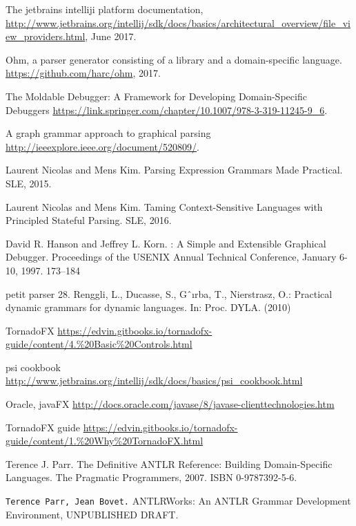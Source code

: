 
\begin{thebibliography}{9}

 The jetbrains intelliji platform documentation, 
	\url{http://www.jetbrains.org/intellij/sdk/docs/basics/architectural_overview/file_view_providers.html}, June 2017.

 Ohm, a parser generator consisting of a library and a domain-specific language.
	\url{https://github.com/harc/ohm}, 2017.	

 The Moldable Debugger: A Framework for Developing Domain-Specific Debuggers
	\url{https://link.springer.com/chapter/10.1007/978-3-319-11245-9_6}.

A graph grammar approach to graphical parsing
	\url{http://ieeexplore.ieee.org/document/520809/}.

Laurent Nicolas and Mens Kim.
Parsing Expression Grammars Made Practical.
SLE, 2015.

Laurent Nicolas and Mens Kim.
Taming Context-Sensitive Languages with Principled Stateful Parsing.
SLE, 2016.	

\bibitem{} 
David R. Hanson and Jeffrey L. Korn. :
A Simple and Extensible Graphical Debugger.
Proceedings of the USENIX Annual Technical Conference, January 6-10, 1997. 173–184

\bibitem{}
petit parser
28. Renggli, L., Ducasse, S., Gˆırba, T., Nierstrasz, O.: Practical dynamic grammars
for dynamic languages. In: Proc. DYLA. (2010)

\bibitem{} TornadoFX
	\url{https://edvin.gitbooks.io/tornadofx-guide/content/4.%20Basic%20Controls.html}

\bibitem{} psi cookbook
	\url{http://www.jetbrains.org/intellij/sdk/docs/basics/psi_cookbook.html}

 Oracle, javaFX
	\url{http://docs.oracle.com/javase/8/javase-clienttechnologies.htm}

 TornadoFX guide
	\url{https://edvin.gitbooks.io/tornadofx-guide/content/1.%20Why%20TornadoFX.html}

 Terence J. Parr. The Definitive ANTLR Reference: Building Domain-Specific Languages. 
	The Pragmatic Programmers, 2007. ISBN 0-9787392-5-6.

\bibitem{} \texttt{Terence Parr, Jean Bovet.} ANTLRWorks: An ANTLR Grammar Development Environment, UNPUBLISHED DRAFT.


\end{thebibliography}

